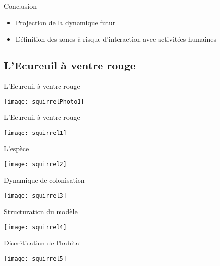 \documentclass[]{beamer}
\begin{document}
\begin{frame}{Conclusion}
 \begin{itemize}
\item Projection de la dynamique futur  
\item Définition des zones à risque d'interaction avec activitées humaines

  \end{itemize}

\end{frame}




\subsection{L'Ecureuil à ventre rouge}
 \begin{frame}{L'Ecureuil à ventre rouge}
\begin{center}
  \texttt{[image: squirrelPhoto1]}
\end{center}
 \end{frame}
 
 \begin{frame}{L'Ecureuil à ventre rouge}
\begin{center}
  \texttt{[image: squirrel1]}
\end{center}
 \end{frame}

 
 \begin{frame}{L'espèce}
\begin{center}
  \texttt{[image: squirrel2]}
\end{center}
 \end{frame}

 

 \begin{frame}{Dynamique de colonisation}
\begin{center}
  \texttt{[image: squirrel3]}
\end{center}
 \end{frame}

 
 \begin{frame}{Structuration du modèle}
\begin{center}
  \texttt{[image: squirrel4]}
\end{center}
 \end{frame}

 
 \begin{frame}{Discrétisation de l'habitat}
\begin{center}
  \texttt{[image: squirrel5]}
\end{center}
 \end{frame}
\end{document}
